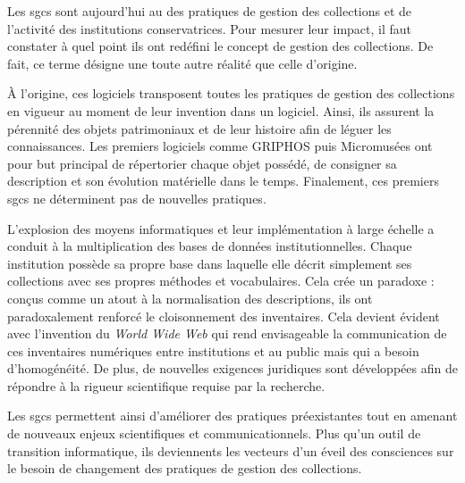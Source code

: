

\label{SGC?}

Les \glspl{sgc} sont aujourd'hui au \coeur des pratiques de gestion des collections et de l'activité des institutions conservatrices. Pour mesurer leur impact, il faut constater à quel point ils ont redéfini le concept de gestion des collections. De fait, ce terme désigne une toute autre réalité que celle d'origine.\newline

À l'origine, ces logiciels transposent toutes les pratiques de gestion des collections en vigueur au moment de leur invention dans un logiciel. Ainsi, ils assurent la pérennité des objets patrimoniaux et de leur histoire afin de léguer les connaissances. Les premiers logiciels comme GRIPHOS puis Micromusées ont pour but principal de répertorier chaque objet possédé, de consigner sa description et son évolution matérielle dans le temps. Finalement, ces premiers \glspl{sgc} ne déterminent pas de nouvelles pratiques.

L'explosion des moyens informatiques et leur implémentation à large échelle a conduit à la multiplication des bases de données institutionnelles. Chaque institution possède sa propre base dans laquelle elle décrit simplement ses collections avec ses propres méthodes et vocabulaires. Cela crée un paradoxe : conçus comme un atout à la normalisation des descriptions, ils ont paradoxalement renforcé le cloisonnement des inventaires. Cela devient évident avec l'invention du \textit{World Wide Web} qui rend envisageable la communication de ces inventaires numériques entre institutions et au public mais qui a besoin d'homogénéité. De plus, de nouvelles exigences juridiques sont développées afin de répondre à la rigueur scientifique requise par la recherche.

Les \glspl{sgc} permettent ainsi d'améliorer des pratiques préexistantes tout en amenant de nouveaux enjeux scientifiques et communicationnels. Plus qu'un outil de transition informatique, ils deviennents les vecteurs d'un éveil des consciences sur le besoin de changement des pratiques de gestion des collections.\newline

